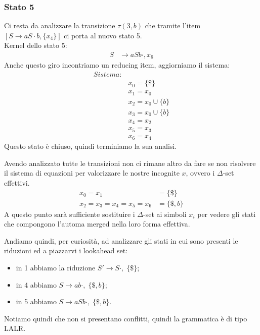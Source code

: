 \documentclass[class=book, crop=false, oneside, 12pt]{standalone}
\begin{document}
\subsubsection*{Stato 5}
Ci resta da analizzare la transizione \(\tau(3,b)\) che tramite l'item \([S \to a S \cdot b, \{x_4\}]\) ci porta al nuovo stato 5.
\\
Kernel dello stato 5:
\begin{align*}
    S &\to a S b \cdot, x_6
\end{align*}
Anche questo giro incontriamo un reducing item, aggiorniamo il sistema:
\begin{align*}
    Sistema:& \\
            & x_0 = \{\$\}\\
            & x_1 = x_0 \\
            & x_2 = x_0 \cup \{b\} \\
            & x_3 = x_0 \cup \{b\} \\
            & x_4 = x_2 \\
            & x_5 = x_3 \\
            & x_6 = x_4
\end{align*}
Questo stato è chiuso, quindi terminiamo la sua analisi.

Avendo analizzato tutte le transizioni non ci rimane altro da fare se non risolvere il sistema di equazioni per valorizzare le nostre incognite \(x\), ovvero i \(\Delta\)-set effettivi.
\begin{align*}
    x_0 = x_1 &= \{\$\} \\
    x_2 = x_3 = x_4 = x_5 = x_6 &= \{\$, b\}
\end{align*}
A questo punto sarà sufficiente sostituire i \(\Delta\)-set ai simboli \(x_i\) per vedere gli stati che compongono l'automa merged nella loro forma effettiva.

Andiamo quindi, per curiosità, ad analizzare gli stati in cui sono presenti le riduzioni ed a piazzarvi i lookahead set:
\begin{itemize}
    \item in 1 abbiamo la riduzione \(S' \to S \cdot, \; \{\$\}\);
    \item in 4 abbiamo \(S \to a b \cdot, \; \{\$, b\}\);
    \item in 5 abbiamo \(S \to aSb \cdot, \; \{\$, b\}\).
\end{itemize}
Notiamo quindi che non si presentano conflitti, quindi la grammatica è di tipo LALR.
\end{document}
